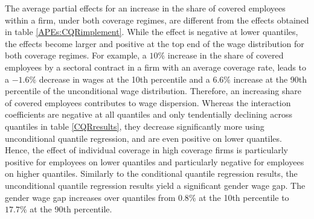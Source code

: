 The average partial effects for an increase in the share of covered employees within a firm, under both coverage regimes, are different from the effects obtained in table \ref{APEs:CQRimplement}. While the effect is negative at lower quantiles, the effects become larger and positive at the top end of the wage distribution for both coverage regimes. For example, a $10\%$ increase in the share of covered employees by a sectoral contract in a firm with an average coverage rate, leads to a $-1.6\%$ decrease in wages at the 10th percentile and a $6.6\%$ increase at the 90th percentile of the unconditional wage distribution. Therefore, an increasing share of covered employees contributes to wage dispersion. Whereas the interaction coefficients are negative at all quantiles and only tendentially declining across quantiles in table \ref{CQRresults}, they decrease significantly more using unconditional quantile regression, and are even positive on lower quantiles. Hence, the effect of individual coverage in high coverage firms is particularly positive for employees on lower quantiles and particularly negative for employees on higher quantiles. Similarly to the conditional quantile regression results, the unconditional quantile regression results yield a significant gender wage gap. The gender wage gap increases over quantiles from $0.8\%$ at the 10th percentile to $17.7\%$ at the 90th percentile.
